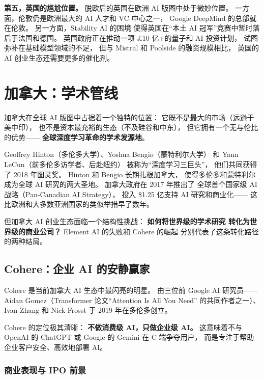 \textbf{第五，英国的尴尬位置。}
脱欧后的英国在欧洲 AI 版图中处于微妙位置。
一方面，伦敦仍是欧洲最大的 AI 人才和 VC 中心之一，
Google DeepMind 的总部就在伦敦。
另一方面，Stability AI 的困境
使得英国在``本土 AI 冠军''竞赛中暂时落后于法国和德国。
英国政府正在推动一项 £10 亿+的量子和 AI 投资计划，
试图弥补在基础模型领域的不足，
但与 Mistral 和 Poolside 的融资规模相比，
英国的 AI 创业生态还需要更多的催化剂。

\section{加拿大：学术管线}
\label{sec:global-canada}

加拿大在全球 AI 版图中占据着一个独特的位置：
它既不是最大的市场（远逊于美中印），
也不是资本最充裕的生态（不及硅谷和中东），
但它拥有一个无与伦比的优势——
\textbf{全球深度学习革命的学术发源地}。

Geoffrey Hinton（多伦多大学）、Yoshua Bengio（蒙特利尔大学）
和 Yann LeCun（前多伦多访学者、后赴纽约）
被称为``深度学习三巨头''，
他们共同获得了 2018 年图灵奖。
Hinton 和 Bengio 长期扎根加拿大，
使得多伦多和蒙特利尔成为全球 AI 研究的两大圣地。
加拿大政府在 2017 年推出了
全球首个国家级 AI 战略（Pan-Canadian AI Strategy），
投入 \$1.25 亿支持 AI 研究和商业化——
这比欧洲和大多数亚洲国家的类似举措早了数年。

但加拿大 AI 创业生态面临一个结构性挑战：
\textbf{如何将世界级的学术研究
转化为世界级的商业公司？}
Element AI 的失败和 Cohere 的崛起
分别代表了这条转化路径的两种结局。

\subsection{Cohere：企业 AI 的安静赢家}

Cohere 是当前加拿大 AI 生态中最闪亮的明星。
由三位前 Google AI 研究员——
Aidan Gomez（Transformer 论文``Attention Is All You Need''
的共同作者之一）、Ivan Zhang 和 Nick Frosst
于 2019 年在多伦多创立。

Cohere 的定位极其清晰：
\textbf{不做消费级 AI，只做企业级 AI。}
这意味着不与 OpenAI 的 ChatGPT 或 Google 的 Gemini
在 C 端争夺用户，
而是专注于帮助企业客户安全、高效地部署 AI。

\subsubsection{商业表现与 IPO 前景}

